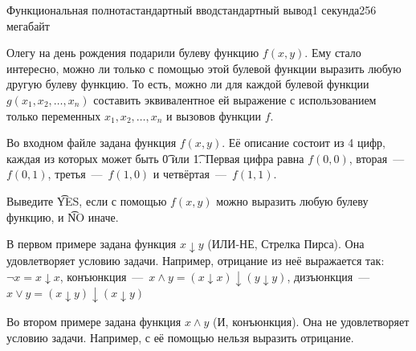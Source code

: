 \begin{problem}{Функциональная полнота}{стандартный ввод}{стандартный вывод}{1 секунда}{256 мегабайт}

Олегу на день рождения подарили булеву функцию $f(x, y)$. Ему стало интересно, можно ли только с помощью этой булевой функции выразить любую другую булеву функцию. То есть, можно ли для каждой булевой функции $g(x_1, x_2, \ldots, x_n)$ составить эквивалентное ей выражение с использованием только переменных $x_1, x_2, \ldots, x_n$ и вызовов функции $f$.

\InputFile
Во входном файле задана функция $f(x, y)$. Её описание состоит из 4 цифр, каждая из которых может быть \t{0} или \t{1}. Первая цифра равна $f(0, 0)$, вторая~---~$f(0, 1)$, третья~---~$f(1, 0)$ и четвёртая~---~$f(1, 1)$.

\OutputFile
Выведите \t{YES}, если с помощью $f(x, y)$ можно выразить любую булеву функцию, и \t{NO} иначе.

\Examples

\begin{example}
%
%
\end{example}

\Note
В первом примере задана функция $x \downarrow y$ (ИЛИ-НЕ, Стрелка Пирса). Она удовлетворяет условию задачи. Например, отрицание из неё выражается так: $\neg x = x \downarrow x$, конъюнкция~---~$x \land y = (x \downarrow x) \downarrow (y \downarrow y)$, дизъюнкция~---~$x \lor y = (x \downarrow y) \downarrow (x \downarrow y)$

Во втором примере задана функция $x \land y$ (И, конъюнкция). Она не удовлетворяет условию задачи. Например, с её помощью нельзя выразить отрицание.

\end{problem}

